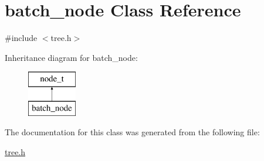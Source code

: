 \hypertarget{classbatch__node}{\section{batch\+\_\+node Class Reference}
\label{classbatch__node}
}


{\ttfamily \#include $<$tree.\+h$>$}

Inheritance diagram for batch\+\_\+node\+:\begin{figure}[H]
\begin{center}
\leavevmode
\includegraphics[height=2.000000cm]{classbatch__node}
\end{center}
\end{figure}


The documentation for this class was generated from the following file\+:\begin{DoxyCompactItemize}
\item 
\hyperlink{tree_8h}{tree.\+h}\end{DoxyCompactItemize}

